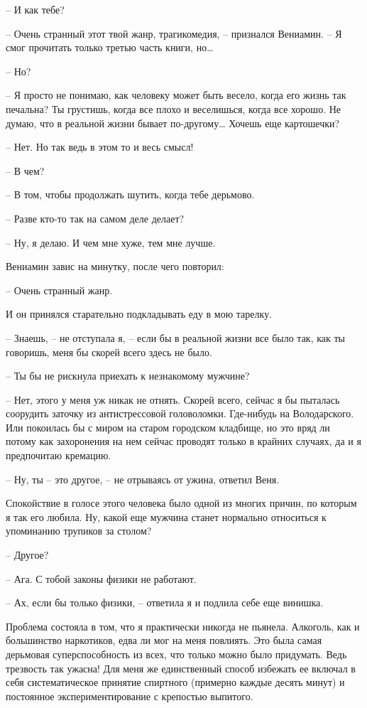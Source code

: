 \documentclass[
]{book}
\begin{document}
-- И как тебе?

-- Очень странный этот твой жанр, трагикомедия, -- признался Вениамин. -- Я смог прочитать только третью часть книги, но\ldots{}

-- Но?

-- Я просто не понимаю, как человеку может быть весело, когда его жизнь так печальна? Ты грустишь, когда все плохо и веселишься, когда все хорошо. Не думаю, что в реальной жизни бывает по-другому\ldots{} Хочешь еще картошечки?

-- Нет. Но так ведь в этом то и весь смысл!

-- В чем?

-- В том, чтобы продолжать шутить, когда тебе дерьмово.

-- Разве кто-то так на самом деле делает?

-- Ну, я делаю. И чем мне хуже, тем мне лучше.

Вениамин завис на минутку, после чего повторил:

-- Очень странный жанр.

И он принялся старательно подкладывать еду в мою тарелку.

-- Знаешь, -- не отступала я, -- если бы в реальной жизни все было так, как ты говоришь, меня бы скорей всего здесь не было.

-- Ты бы не рискнула приехать к незнакомому мужчине?

-- Нет, этого у меня уж никак не отнять. Скорей всего, сейчас я бы пыталась соорудить заточку из антистрессовой головоломки. Где-нибудь на Володарского. Или покоилась бы с миром на старом городском кладбище, но это вряд ли потому как захоронения на нем сейчас проводят только в крайних случаях, да и я предпочитаю кремацию.

-- Ну, ты -- это другое, -- не отрываясь от ужина, ответил Веня.

Спокойствие в голосе этого человека было одной из многих причин, по которым я так его любила. Ну, какой еще мужчина станет нормально относиться к упоминанию трупиков за столом?

-- Другое?

-- Ага. С тобой законы физики не работают.

-- Ах, если бы только физики, -- ответила я и подлила себе еще винишка.

Проблема состояла в том, что я практически никогда не пьянела. Алкоголь, как и большинство наркотиков, едва ли мог на меня повлиять. Это была самая дерьмовая суперспособность из всех, что только можно было придумать. Ведь трезвость так ужасна! Для меня же единственный способ избежать ее включал в себя систематическое принятие спиртного (примерно каждые десять минут) и постоянное экспериментирование с крепостью выпитого.
\end{document}
